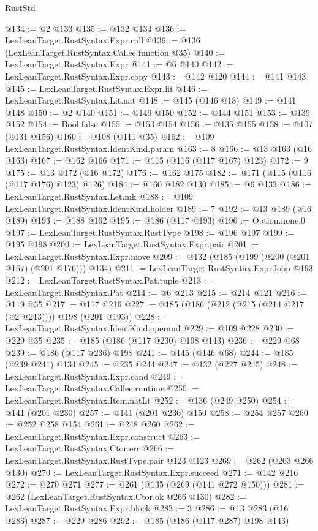 \begin{lexlean}{RustStd}
\begin{coremodule}
@134 := @2 @133
@135 := @132 @134
@136 := LexLeanTarget.RustSyntax.Expr.call
@139 := @136 (LexLeanTarget.RustSyntax.Callee.function @35)
@140 := LexLeanTarget.RustSyntax.Expr
@141 := @6 @140
@142 := LexLeanTarget.RustSyntax.Expr.copy
@143 := @142 @120
@144 := @141 @143
@145 := LexLeanTarget.RustSyntax.Expr.lit
@146 := LexLeanTarget.RustSyntax.Lit.nat
@148 := @145 (@146 @18)
@149 := @141 @148
@150 := @2 @140
@151 := @149 @150
@152 := @144 @151
@153 := @139 @152
@154 := Bool.false
@155 := @153 @154
@156 := @135 @155
@158 := @107 (@131 @156)
@160 := @108 (@111 @35)
@162 := @109 LexLeanTarget.RustSyntax.IdentKind.param
@163 := 8
@166 := @13 @163 (@16 @163)
@167 := @162 @166
@171 := @115 (@116 (@117 @167) @123)
@172 := 9
@175 := @13 @172 (@16 @172)
@176 := @162 @175
@182 := @171 (@115 (@116 (@117 @176) @123) @126)
@184 := @160 @182 @130
@185 := @6 @133
@186 := LexLeanTarget.RustSyntax.Let.mk
@188 := @109 LexLeanTarget.RustSyntax.IdentKind.holder
@189 := 7
@192 := @13 @189 (@16 @189)
@193 := @188 @192
@195 := @186 (@117 @193)
@196 := Option.none.{0}
@197 := LexLeanTarget.RustSyntax.RustType
@198 := @196 @197
@199 := @195 @198
@200 := LexLeanTarget.RustSyntax.Expr.pair
@201 := LexLeanTarget.RustSyntax.Expr.move
@209 := @132 (@185 (@199 (@200 (@201 @167) (@201 @176))) @134)
@211 := LexLeanTarget.RustSyntax.Expr.loop @193
@212 := LexLeanTarget.RustSyntax.Pat.tuple
@213 := LexLeanTarget.RustSyntax.Pat
@214 := @6 @213
@215 := @214 @121
@216 := @119 @35
@217 := @117 @216
@227 := @185 (@186 (@212 (@215 (@214 @217 (@2 @213)))) @198 (@201 @193))
@228 := LexLeanTarget.RustSyntax.IdentKind.operand
@229 := @109 @228
@230 := @229 @35
@235 := @185 (@186 (@117 @230) @198 @143)
@236 := @229 @68
@239 := @186 (@117 @236) @198
@241 := @145 (@146 @68)
@244 := @185 (@239 @241) @134
@245 := @235 @244
@247 := @132 (@227 @245)
@248 := LexLeanTarget.RustSyntax.Expr.cond
@249 := LexLeanTarget.RustSyntax.Callee.runtime
@250 := LexLeanTarget.RustSyntax.Item.natLt
@252 := @136 (@249 @250)
@254 := @141 (@201 @230)
@257 := @141 (@201 @236) @150
@258 := @254 @257
@260 := @252 @258 @154
@261 := @248 @260
@262 := LexLeanTarget.RustSyntax.Expr.construct
@263 := LexLeanTarget.RustSyntax.Ctor.err
@266 := LexLeanTarget.RustSyntax.RustType.pair @123 @123
@269 := @262 (@263 @266 @130)
@270 := LexLeanTarget.RustSyntax.Expr.succeed
@271 := @142 @216
@272 := @270 @271
@277 := @261 (@135 (@269 (@141 @272 @150)))
@281 := @262 (LexLeanTarget.RustSyntax.Ctor.ok @266 @130)
@282 := LexLeanTarget.RustSyntax.Expr.block
@283 := 3
@286 := @13 @283 (@16 @283)
@287 := @229 @286
@292 := @185 (@186 (@117 @287) @198 @143)

\end{coremodule}
\end{lexlean}
